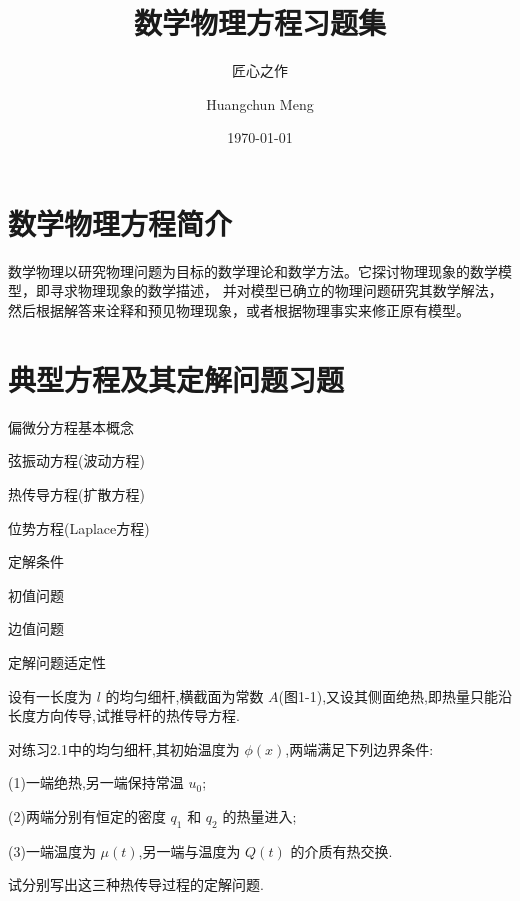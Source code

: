 \documentclass[color=blue,lang=cn,newtx,10pt,scheme=chinese]{elegantbook}
\title{数学物理方程习题集}
\subtitle{匠心之作}
\author{Huangchun Meng}
\institute{School of Mathematics NUAA}
\date{\today}
\begin{document}
\maketitle
\frontmatter

\tableofcontents

\mainmatter

\chapter{数学物理方程简介}%

数学物理以研究物理问题为目标的数学理论和数学方法。它探讨物理现象的数学模型，即寻求物理现象的数学描述，
并对模型已确立的物理问题研究其数学解法，然后根据解答来诠释和预见物理现象，或者根据物理事实来修正原有模型。




\chapter{典型方程及其定解问题习题}%

\begin{introduction}
  \item 偏微分方程基本概念
  \item 弦振动方程(波动方程)
  \item 热传导方程(扩散方程)
  \item 位势方程(Laplace方程)
  \item 定解条件
  \item 初值问题
  \item 边值问题
  \item 定解问题适定性
\end{introduction}
\quad

\begin{exercise}
设有一长度为 $l$ 的均匀细杆,横截面为常数 $A$(图1-1),又设其侧面绝热,即热量只能沿长度方向传导,试推导杆的热传导方程.
\end{exercise}
\quad

\begin{solution}
  
\end{solution}
  
\quad

\begin{exercise}
对练习2.1中的均匀细杆,其初始温度为 $\phi (x)$,两端满足下列边界条件:

(1)一端绝热,另一端保持常温 $u_0$;

(2)两端分别有恒定的密度 $q_1$ 和 $q_2$ 的热量进入;

(3)一端温度为 $\mu (t)$,另一端与温度为 $Q(t)$ 的介质有热交换.

试分别写出这三种热传导过程的定解问题.
\end{exercise}
\quad
\end{document}
